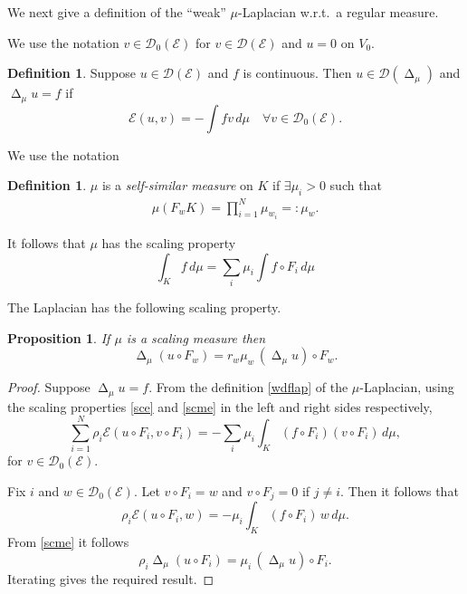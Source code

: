 \documentclass[a4paper]{amsart}
\theoremstyle{plain}
\newtheorem{proposition}[theorem]{Proposition}
\theoremstyle{definition}
\newtheorem{definition}[theorem]{Definition}%
\theoremstyle{remark}
\DeclareMathOperator{\lap}{\Delta}
\begin{document}
\bigskip We next give a   definition of the ``weak'' $ \mu $-Laplacian w.r.t.\  a regular measure.

We use the notation $ v \in \mathcal{D} _0 ( \mathcal{E} ) $ for $ v \in \mathcal{D} ( \mathcal{E} ) $ and $ u=0 $ on $ V_0 $.

\begin{definition} Suppose $ u \in \mathcal{D} ( \mathcal{E} ) $ and $ f $ is continuous.  Then $ u \in \mathcal{D} ( \lap_ \mu ) $ and $ \lap_\mu u=f $ if 
\begin{equation} \label{wdflap}
\mathcal{E} (u,v) = - \int fv\, d\mu \quad \forall v \in \mathcal{D} _0 ( \mathcal{E} ) .
\end{equation} 
\end{definition} 

We use the notation
\begin{definition} $ \mu $ is a \emph{self-similar measure} on $ K $ if  $ \exists \mu_i > 0 $ such that
\begin{align*} 
\mu(F_w K ) = \prod_{i=1}^N \mu_{w_i} =: \mu_w .
\end{align*} 
\end{definition}

It follows that $ \mu $ has the scaling property 
\begin{equation} \label{} 
\int_K f\, d\mu = \sum_i \mu_i \int f \circ F_i \, d\mu  
\end{equation} 

The Laplacian has the following scaling property.

\begin{proposition} If $ \mu $ is a scaling measure then
\begin{equation} \label{scme}
\lap_\mu (u \circ F_w) = r_w \mu_w\,  (\lap_\mu u ) \circ F_w.
\end{equation}
\end{proposition} 

\begin{proof}
Suppose $ \lap_\mu u = f $. From the definition \eqref{wdflap} of the  $ \mu $-Laplacian, using the scaling properties \eqref{sce}  
and \eqref{scme} in the left and right sides respectively,
\[
\sum_{i=1}^N \rho_i \mathcal{E} (u \circ F_i,  v \circ F_i) 
    = -\sum_i \mu_i \int_K (f \circ F_i)   (v\circ F_i) \, d\mu  ,
    \] 
    for $ v \in   \mathcal{D} _0 ( \mathcal{E} ) $.
    
    Fix $ i $ and $ w \in \mathcal{D} _0 ( \mathcal{E} ) $.  Let $ v \circ F_i = w $ and $ v \circ F_j = 0 $ if $ j \neq i $.
    Then it follows that 
    \[
    \rho_i \mathcal{E} ( u \circ F_i, w ) = - \mu_i \int_K (f\circ F_i )\, w \, d\mu .
    \]
From \eqref{scme} it follows
\[
\rho_i \lap_\mu (u\circ F_i) = \mu_i\,  (\lap_\mu u )\circ F_i   .
\]
Iterating gives the required result. 
\end{proof} 
\end{document}
